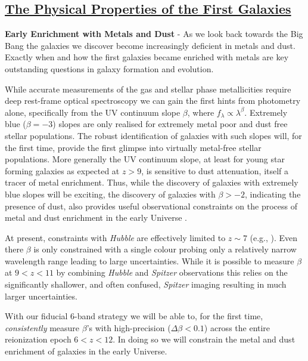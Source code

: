 \documentclass[12pt]{article}
\begin{document}
\subsection*{\bf \underline{The Physical Properties of the First Galaxies}}

\noindent
\textbf{Early Enrichment with Metals and Dust} - As we look back towards the Big Bang the galaxies we discover become increasingly deficient in metals and dust. Exactly when and how the first galaxies became enriched with metals are key outstanding questions in galaxy formation and evolution.

While accurate measurements of the gas and stellar phase metallicities require deep rest-frame optical spectroscopy we can gain the first hints from photometry alone, specifically from the UV continuum slope $\beta$,  where $f_{\lambda}\propto\lambda^{\beta}$. Extremely blue ($\beta = -3$) slopes are only realised for extremely metal poor and dust free stellar populations. The robust identification of galaxies with such slopes will, for the first time, provide the first glimpse into virtually metal-free stellar populations. More generally the UV continuum slope, at least for young star forming galaxies as expected at $z>9$, is sensitive to dust attenuation, itself a tracer of metal enrichment. Thus, while the discovery of galaxies with extremely blue slopes will be exciting, the discovery of galaxies with $\beta > -2$, indicating the presence of dust, also provides useful observational constraints on the process of metal and dust enrichment in the early Universe \citep[e.g.,][]{2017ApJ...837L..21L}. 

At present, constraints with \emph{Hubble} are effectively limited to $z\sim 7$ (e.g., \citealt{Finkelstein2012, Bouwens2014, Bhatawdekar2020}). Even there $\beta$ is only constrained with a single colour probing only a relatively narrow wavelength range leading to large uncertainties. While it is possible to measure $\beta$ at $9<z<11$ by combining {\em Hubble} and {\em Spitzer} observations \citep[e.g.,][]{2016MNRAS.455..659W} this relies on the significantly shallower, and often confused, {\em Spitzer} imaging resulting in much larger uncertainties. 

With our fiducial 6-band strategy we will be able to, for the first time, \emph{consistently} measure $\beta$'s with high-precision ($\Delta\beta <0.1$) across the entire reionization epoch $6<z<12$. In doing so we will constrain the metal and dust enrichment of galaxies in the early Universe.
\end{document}
